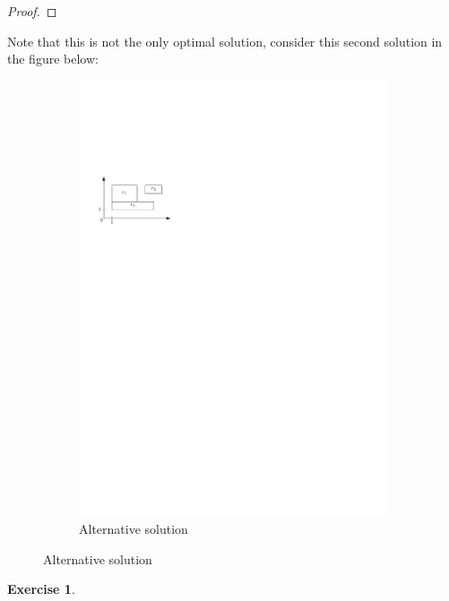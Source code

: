 \documentclass[a4paper,12pt,headsepline]{scrartcl}
\newtheorem{aufgabe}{Exercise}
\begin{document}
\begin{enumerate}[a)]
\begin{proof}
\end{proof}
Note that this is not the only optimal solution, consider this second solution in the figure below:
	\begin{figure}[H]
	\centering
	\begin{subfigure}{0.48\textwidth}
		\centering
		\includegraphics[width=1\linewidth,page=3]{graphics/7_2.pdf}
		\caption*{Alternative solution}
	\end{subfigure}
\end{figure}
\end{enumerate}
\newpage
\begin{aufgabe}
\end{aufgabe}
\end{document}
